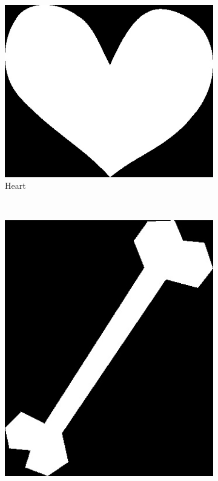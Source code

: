 \documentclass[a4paper,psfig,subfigure,epsfig,fleqn,amssmb,float,caption,fontenc,ausarbeitung]{article}
\begin{document}
\begin{figure}
	\centering
	\begin{subfigure}[b]{0.3\textwidth}
		\includegraphics[width=\textwidth]{img/Heart-1}
		\caption{Heart}
	\end{subfigure}
	~ 
	\begin{subfigure}[b]{0.3\textwidth}
		\includegraphics[width=\textwidth]{img/Bone}

\end{subfigure}
\end{figure}
\end{document}
